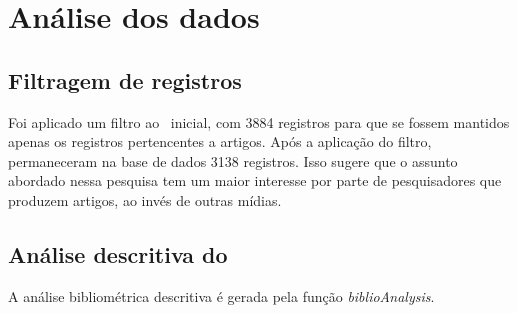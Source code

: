 \section{Análise dos dados}

\subsection{Filtragem de registros}
Foi aplicado um filtro ao \dataset\ inicial, com 3884 registros para que se fossem mantidos apenas os registros pertencentes a artigos. Após a aplicação do filtro,
permaneceram na base de dados 3138 registros. Isso sugere que o assunto abordado nessa pesquisa tem um maior interesse por parte de pesquisadores que produzem artigos, ao invés de outras mídias.
\subsection{Análise descritiva do \dataset\ }

A análise bibliométrica descritiva é gerada pela função \textit{biblioAnalysis}.

